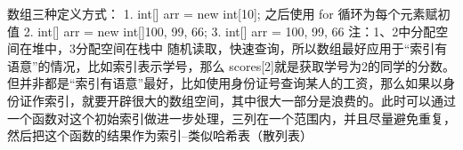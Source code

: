 \markdownRendererInterblockSeparator
{}\markdownRendererInterblockSeparator
{}数组三种定义方式： 1. int[] arr = new int[10]; 之后使用 for 循环为每个元素赋初值 2. int[] arr = new int[]\markdownRendererLeftBrace{}100, 99, 66\markdownRendererRightBrace{}; 3. int[] arr = \markdownRendererLeftBrace{}100, 99, 66\markdownRendererRightBrace{} 注：1、2中分配空间在堆中，3分配空间在栈中\markdownRendererInterblockSeparator
{}\markdownRendererInterblockSeparator
{}随机读取，快速查询，所以数组最好应用于“索引有语意”的情况，比如索引表示学号，那么 scores[2]就是获取学号为2的同学的分数。\markdownRendererInterblockSeparator
{}但并非都是“索引有语意”最好，比如使用身份证号查询某人的工资，那么如果以身份证作索引，就要开辟很大的数组空间，其中很大一部分是浪费的。此时可以通过一个函数对这个初始索引做进一步处理，三列在一个范围内，并且尽量避免重复，然后把这个函数的结果作为索引--类似哈希表（散列表）\relax